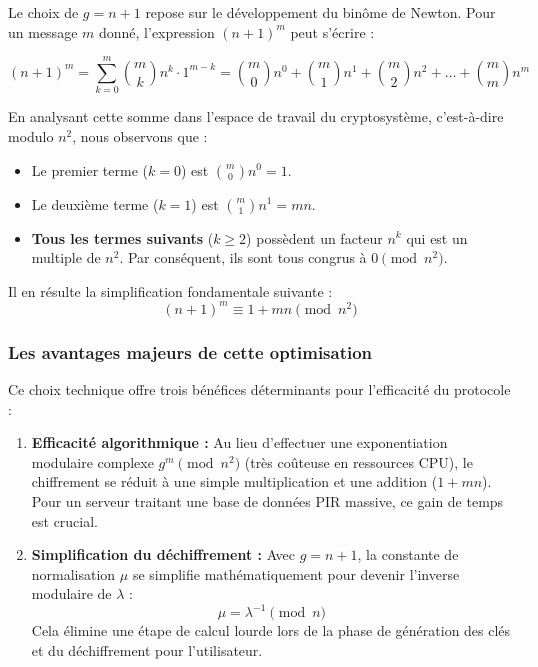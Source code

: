 \documentclass[12pt,a4paper]{report}
\begin{document}
\begin{enumerate}
Le choix de $g = n+1$ repose sur le développement du binôme de Newton. Pour un message $m$ donné, l'expression $(n+1)^m$ peut s'écrire :

\[
(n+1)^m = \sum_{k=0}^{m} \binom{m}{k} n^k \cdot 1^{m-k} = \binom{m}{0}n^0 + \binom{m}{1}n^1 + \binom{m}{2}n^2 + \dots + \binom{m}{m}n^m
\]

En analysant cette somme dans l'espace de travail du cryptosystème, c'est-à-dire modulo $n^2$, nous observons que :
\begin{itemize}
    \item Le premier terme ($k=0$) est $\binom{m}{0}n^0 = 1$.
    \item Le deuxième terme ($k=1$) est $\binom{m}{1}n^1 = mn$.
    \item \textbf{Tous les termes suivants} ($k \geq 2$) possèdent un facteur $n^k$ qui est un multiple de $n^2$. Par conséquent, ils sont tous congrus à $0 \pmod{n^2}$.
\end{itemize}

Il en résulte la simplification fondamentale suivante :
\begin{equation}
    (n+1)^m \equiv 1 + mn \pmod{n^2}
\end{equation}



\subsubsection{Les avantages majeurs de cette optimisation}

Ce choix technique offre trois bénéfices déterminants pour l'efficacité du protocole :

\begin{enumerate}
    \item \textbf{Efficacité algorithmique :} Au lieu d'effectuer une exponentiation modulaire complexe $g^m \pmod{n^2}$ (très coûteuse en ressources CPU), le chiffrement se réduit à une simple multiplication et une addition ($1 + mn$). Pour un serveur traitant une base de données PIR massive, ce gain de temps est crucial.
    
    \item \textbf{Simplification du déchiffrement :} Avec $g = n+1$, la constante de normalisation $\mu$ se simplifie mathématiquement pour devenir l'inverse modulaire de $\lambda$ :
    \[ \mu = \lambda^{-1} \pmod n \]
    Cela élimine une étape de calcul lourde lors de la phase de génération des clés et du déchiffrement pour l'utilisateur.


\end{enumerate}
\end{enumerate}
\end{document}
